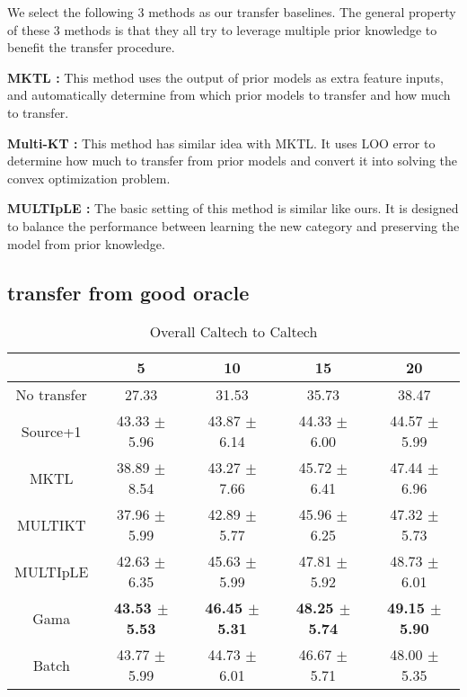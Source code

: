 We select the following 3 methods as our transfer baselines. The general property of these 3 methods is that they all try to leverage multiple prior knowledge to benefit the transfer procedure.

\textbf{MKTL \cite{jie2011multiclass}:} This method uses the output of prior models as extra feature inputs, and automatically determine from which prior models to transfer and how much to transfer.


\textbf{Multi-KT \cite{tommasi2014learning}:} This method has similar idea with MKTL. It uses LOO error to determine how much to transfer from prior models and convert it into solving the convex optimization problem.

\textbf{MULTIpLE \cite{kuzborskij2013n}:} The basic setting of this method is similar like ours. It is designed to balance the performance between learning the new category and preserving the model from prior knowledge.

\subsection{transfer from good oracle}
%
%

\begin{table}[htbp]
  \centering
  \caption{Overall Caltech to Caltech}
    \begin{tabular}{ccccc}
    \toprule
          & 5     & 10    & 15    & 20 \\
    \midrule
    No transfer &         27.33  &         31.53  &         35.73  &         38.47  \\
    Source+1    &         43.33 $\pm$ 5.96 &         43.87 $\pm$ 6.14  &         44.33 $\pm$ 6.00 &         44.57 $\pm$ 5.99  \\
    MKTL        &         38.89 $\pm$ 8.54 &         43.27 $\pm$ 7.66  &         45.72 $\pm$ 6.41 &         47.44 $\pm$ 6.96  \\
    MULTIKT     &         37.96 $\pm$ 5.99 &         42.89 $\pm$ 5.77  &         45.96 $\pm$ 6.25 &         47.32 $\pm$ 5.73 \\
    MULTIpLE    &         42.63 $\pm$ 6.35 &         45.63 $\pm$ 5.99  &         47.81 $\pm$ 5.92 &         48.73 $\pm$ 6.01\\
    Gama        &         \textbf{43.53 $\pm$ 5.53}&         \textbf{46.45 $\pm$ 5.31} &         \textbf{48.25 $\pm$ 5.74} &         \textbf{49.15 $\pm$ 5.90} \\
    Batch       &         43.77  $\pm$ 5.99&         44.73  $\pm$ 6.01 &         46.67 $\pm$ 5.71 &         48.00 $\pm$ 5.35\\
    \bottomrule
    \end{tabular}%
  \label{tab:C2C}%
\end{table}%

